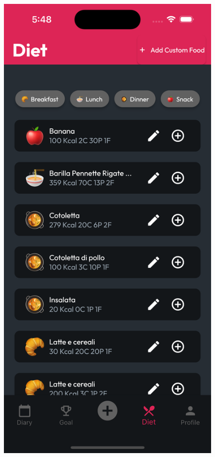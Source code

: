 \documentclass{Configuration_Files/PoliMi3i_thesis}
\begin{document}
\begin{figure}[!h]
  \centering
  \includegraphics[scale=0.1]{Images/Screenshots/Mobile/Diet.png}

\end{figure}
\end{document}
